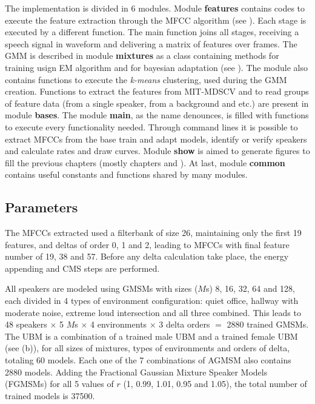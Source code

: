 The implementation is divided in 6 modules. Module \textbf{features} contains codes to execute the feature extraction through the MFCC algorithm (see ). Each stage is executed by a different function. The main function joins all stages, receiving a speech signal in waveform and delivering a matrix of features over frames. The GMM is described in module \textbf{mixtures} as a class containing methods for training usign EM algorithm and for bayesian adaptation (see ). The module also contains functions to execute the \emph{k-means} clustering, used during the GMM creation. Functions to extract the features from MIT-MDSCV and to read groups of feature data (from a single speaker, from a background and etc.) are present in module \textbf{bases}. The module \textbf{main}, as the name denounces, is filled with functions to execute every functionality needed. Through command lines it is possible to extract MFCCs from the base train and adapt models, identify or verify speakers and calculate rates and draw curves. Module \textbf{show} is aimed to generate figures to fill the previous chapters (mostly chapters  and ). At last, module \textbf{common} contains useful constants and functions shared by many modules.

\subsection{Parameters}

The MFCCs extracted used a filterbank of size 26, maintaining only the first 19 features, and deltas of order 0, 1 and 2, leading to MFCCs with final feature number of 19, 38 and 57. Before any delta calculation take place, the energy appending and CMS steps are performed.

All speakers are modeled using GMSMs with sizes ($M$s) 8, 16, 32, 64 and 128, each divided in 4 types of environment configuration: quiet office, hallway with moderate noise, extreme loud intersection and all three combined. This leads to 48 speakers $\times$ 5 $M$s $\times$ 4 environments $\times$ 3 delta orders $=$ 2880 trained GMSMs. The UBM is a combination of a trained male UBM and a trained female UBM (see  (b)), for all sizes of mixtures, types of environments and orders of delta, totaling 60 models. Each one of the 7 combinations of AGMSM also contains 2880 models. Adding the Fractional Gaussian Mixture Speaker Models (FGMSMs) for all 5 values of $r$ (1, 0.99, 1.01, 0.95 and 1.05), the total number of trained models is 37500.

